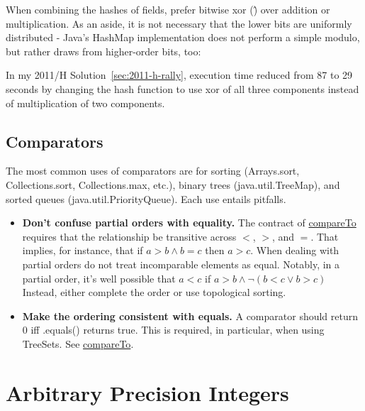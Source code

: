 \begin{itemize}
When combining the hashes of fields, prefer bitwise xor (\^) over addition
or multiplication.  As an aside, it is not necessary that the lower bits are uniformly distributed -
Java's HashMap implementation does not perform a simple modulo, but rather draws
from higher-order bits, too:


In my 2011/H Solution~\ref{sec:2011-h-rally}, execution time reduced from 87 to 29 
seconds by changing the hash function to use xor of all three components instead 
of multiplication of two components.

\end{itemize}

\subsection{Comparators}
\label{sec:comparators}

The most common uses of comparators are for sorting (Arrays.sort, Collections.sort, Collections.max, etc.), 
binary trees (java.util.TreeMap), and sorted queues (java.util.PriorityQueue).
Each use entails pitfalls.

\begin{itemize}
\item \textbf{Don't confuse partial orders with equality.}
    The contract of
    \href{http://docs.oracle.com/javase/6/docs/api/java/lang/Comparable.html#compareTo(T)}{compareTo}
    requires that the relationship be transitive across $<$, $>$, and $=$.  That implies, for instance, 
    that if $a > b \land b = c$ then $a > c$.
    When dealing with partial orders do not treat incomparable elements as equal.  Notably,
    in a partial order, it's well possible that $a < c$ if $a > b \land \lnot (b < c \lor b > c)$
    Instead, either complete the order or use topological sorting.

\item \textbf{Make the ordering consistent with equals.}
    A comparator should return 0 iff .equals() returns true.   This is required, in particular, when
    using TreeSets.  See \href{http://docs.oracle.com/javase/6/docs/api/java/lang/Comparable.html#compareTo(T)}{compareTo}.

\end{itemize}


\section{Arbitrary Precision Integers}

